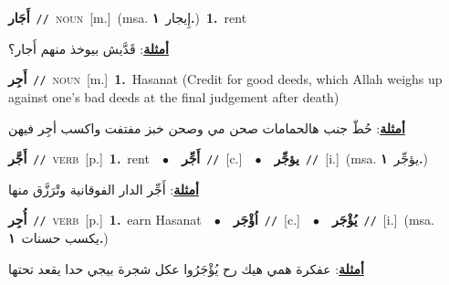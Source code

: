 \documentclass[10pt,a4paper,twoside]{article} %
\begin{document}
\begin{multicols}{2}
{\setlength\topsep{0pt}\textbf{\foreignlanguage{arabic}{أَجَار}}\ {\color{gray}\texttt{//}\color{black}}\ \textsc{noun}\ [m.]\ \color{gray}(msa. \foreignlanguage{arabic}{إِيجار}~\foreignlanguage{arabic}{\textbf{١.}})\color{black}\ \textbf{1.}~rent\  \begin{flushright}\color{gray}\foreignlanguage{arabic}{\textbf{\underline{\foreignlanguage{arabic}{أمثلة}}}: قَدَّيش بيوخذ منهم أَجار؟}\end{flushright}\color{black}} \vspace{2mm}

{\setlength\topsep{0pt}\textbf{\foreignlanguage{arabic}{أَجِر}}\ {\color{gray}\texttt{//}\color{black}}\ \textsc{noun}\ [m.]\ \textbf{1.}~Hasanat (Credit for good deeds, which Allah weighs up against one's bad deeds at the final judgement after death)\  \begin{flushright}\color{gray}\foreignlanguage{arabic}{\textbf{\underline{\foreignlanguage{arabic}{أمثلة}}}: حُطّ جنب هالحمامات صحن مي وصحن خبز مفتفت واكسب أجِر فيهن}\end{flushright}\color{black}} \vspace{2mm}

{\setlength\topsep{0pt}\textbf{\foreignlanguage{arabic}{أَجَّر}}\ {\color{gray}\texttt{//}\color{black}}\ \textsc{verb}\ [p.]\ \textbf{1.}~rent\ \ $\bullet$\ \ \setlength\topsep{0pt}\textbf{\foreignlanguage{arabic}{أَجِّر}}\ {\color{gray}\texttt{//}\color{black}}\ [c.]\ \ $\bullet$\ \ \setlength\topsep{0pt}\textbf{\foreignlanguage{arabic}{يؤجِّر}}\ {\color{gray}\texttt{//}\color{black}}\ [i.]\ \color{gray}(msa. \foreignlanguage{arabic}{يؤجِّر}~\foreignlanguage{arabic}{\textbf{١.}})\color{black}\  \begin{flushright}\color{gray}\foreignlanguage{arabic}{\textbf{\underline{\foreignlanguage{arabic}{أمثلة}}}: أَجِّر الدار الفوقانية وتْرَزَّق منها}\end{flushright}\color{black}} \vspace{2mm}

{\setlength\topsep{0pt}\textbf{\foreignlanguage{arabic}{أُجِر}}\ {\color{gray}\texttt{//}\color{black}}\ \textsc{verb}\ [p.]\ \textbf{1.}~earn Hasanat\ \ $\bullet$\ \ \setlength\topsep{0pt}\textbf{\foreignlanguage{arabic}{اُؤْجَر}}\ {\color{gray}\texttt{//}\color{black}}\ [c.]\ \ $\bullet$\ \ \setlength\topsep{0pt}\textbf{\foreignlanguage{arabic}{يُؤْجَر}}\ {\color{gray}\texttt{//}\color{black}}\ [i.]\ \color{gray}(msa. \foreignlanguage{arabic}{يكسب حسنات}~\foreignlanguage{arabic}{\textbf{١.}})\color{black}\  \begin{flushright}\color{gray}\foreignlanguage{arabic}{\textbf{\underline{\foreignlanguage{arabic}{أمثلة}}}: عفكرة همي هيك رح يُؤْجَرُوا عكل شجرة بيجي حدا يقعد تحتها}\end{flushright}\color{black}} \vspace{2mm}


\end{multicols}
\end{document}
